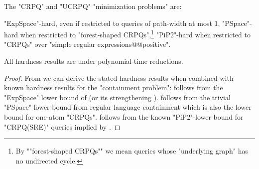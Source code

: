 \begin{corollary}
	\AP\label{coro:lowerbounds}
	The "CRPQ" and "UCRPQ" "minimization problems" are:
	\begin{enumerate}
		\itemAP\label{expspace-h:pw1}"ExpSpace"-hard, even
		if restricted to queries of path-width at most 1,
		\itemAP\label{pspace:forest} "PSpace"-hard when restricted to "forest-shaped CRPQs",\footnote{By \AP""forest-shaped CRPQs"" we mean queries whose "underlying graph" has no undirected cycle.}
		\itemAP\label{pip2:crpqsre} "PiP2"-hard when restricted to "CRPQs" over "simple regular expressions@@positive".
	\end{enumerate}
	All hardness results are under polynomial-time reductions.
\end{corollary}

\begin{proof}
	From  we can derive the stated hardness results when combined with known hardness results for the "containment problem":
	 follows from the "ExpSpace" lower bound of \cite[Lemma 8]{Figueira2020Containment} (or its strengthening ).
%
	 follows from the trivial "PSpace" lower bound from regular language containment which is also the lower bound for one-atom "CRPQs".
%
	 follows from the known "PiP2"-lower bound for "CRPQ(SRE)" queries implied by \cite[Theorem 4.2]{FigueiraEtal2020Containment}.
\end{proof}